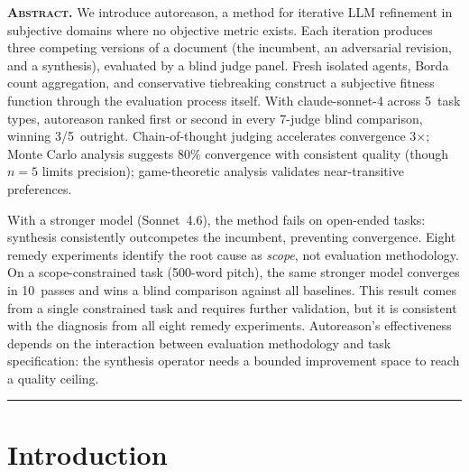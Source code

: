 \documentclass[10pt,twocolumn]{article}
\begin{document}

\noindent\textbf{\scshape Abstract.}\enspace
We introduce autoreason, a method for iterative LLM refinement in subjective domains where no objective metric exists. Each iteration produces three competing versions of a document (the incumbent, an adversarial revision, and a synthesis), evaluated by a blind judge panel. Fresh isolated agents, Borda count aggregation, and conservative tiebreaking construct a subjective fitness function through the evaluation process itself. With claude-sonnet-4 across 5~task types, autoreason ranked first or second in every 7-judge blind comparison, winning 3/5~outright. Chain-of-thought judging accelerates convergence 3$\times$; Monte Carlo analysis suggests 80\% convergence with consistent quality (though $n{=}5$ limits precision); game-theoretic analysis validates near-transitive preferences.

With a stronger model (Sonnet~4.6), the method fails on open-ended tasks: synthesis consistently outcompetes the incumbent, preventing convergence. Eight remedy experiments identify the root cause as \textit{scope}, not evaluation methodology. On a scope-constrained task (500-word pitch), the same stronger model converges in 10~passes and wins a blind comparison against all baselines. This result comes from a single constrained task and requires further validation, but it is consistent with the diagnosis from all eight remedy experiments. Autoreason's effectiveness depends on the interaction between evaluation methodology and task specification: the synthesis operator needs a bounded improvement space to reach a quality ceiling.

\vspace{6pt}
\hrule
\vspace{6pt}

\section{Introduction}
\end{document}
